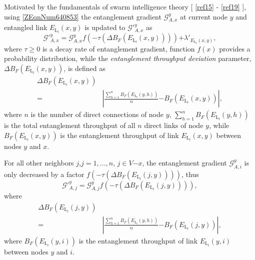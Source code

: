 \documentclass[11pt]{article}%
\newcommand*{\cref}[1]{%
  \begingroup
    \hypersetup{
      linkcolor=linkequation,
      linkbordercolor=linkequation,
    }%
    \ref{#1}%
  \endgroup
}
\begin{document}
 Motivated by the fundamentals of swarm intelligence theory [\cref{ref15}-\cref{ref19}], using \eqref{ZEqnNum640853} the entanglement gradient ${\mathcal{G}}^y_{A,x}$ at current node $y$ and entangled link $E_{{\mathrm{L}}_l}\left(x,y\right)$ is updated to ${\mathcal{G}}'^y_{A,x}$ as
\begin{equation} \label{ZEqnNum489942} 
{\mathcal{G}}'^y_{A,x}\mathrm{=}{\mathcal{G}}^y_{A,x}f\left(\mathrm{-}\tau \left(\mathit{\Delta}B_F\left(E_{{\mathrm{L}}_l}\left(x,y\right)\right)\right)\right)\mathrm{+}{\lambda }'_{E_{{\mathrm{L}}_l}\left(x,y\right)},                                                         
\end{equation} 
where $\tau \mathrm{\ge }\mathrm{0}$ is a decay rate of entanglement gradient, function $f\left(x\right)$ provides a probability distribution, while the \textit{entanglement throughput deviation} parameter, $\mathit{\Delta}B_F\left(E_{{\mathrm{L}}_l}\left(x,y\right)\right)$, is defined as
\begin{equation} \label{4)} 
\begin{split}
\mathit{\Delta}B_F\left(E_{{\mathrm{L}}_l}\left(x,y\right)\right)\\\mathrm{=}&\left|\frac{\sum^n_{h\mathrm{=1}}{B_F\left(E_{{\mathrm{L}}_l}\left(y,h\right)\right)}}{n}\mathrm{-}B_F\left(E_{{\mathrm{L}}_l}\left(x,y\right)\right)\right|,                                                        
\end{split}
\end{equation} 
where $n$ is the number of direct connections of node $y$, $\sum^n_{h\mathrm{=1}}{B_F\left(E_{{\mathrm{L}}_l}\left(y,h\right)\right)}$ is the total entanglement throughput of all $n$ direct links of node $y$, while $B_F\left(E_{{\mathrm{L}}_l}\left(x,y\right)\right)$ is the entanglement throughput of link $E_{{\mathrm{L}}_l}\left(x,y\right)$ between nodes $y$ and $x$. 

 For all other neighbors $j$,$j\mathrm{=1,\dots ,}n$, $j\mathrm{\in }V\mathrm{-}x$, the entanglement gradient ${\mathcal{G}}^y_{A,i}$ is only decreased by a factor $f\left(\mathrm{-}\tau \left(\mathit{\Delta}B_F\left(E_{{\mathrm{L}}_l}\left(j,y\right)\right)\right)\right)$, thus
\begin{equation} \label{ZEqnNum529081} 
{\mathcal{G}}'^y_{A,j}\mathrm{=}{\mathcal{G}}^y_{A,j}f\left(\mathrm{-}\tau \left(\mathit{\Delta}B_F\left(E_{{\mathrm{L}}_l}\left(j,y\right)\right)\right)\right),                                                                     
\end{equation} 
where 
\begin{equation} \label{6)} 
\begin{split}
\mathit{\Delta}B_F\left(E_{{\mathrm{L}}_l}\left(j,y\right)\right)\\\mathrm{=}&\left|\frac{\sum^n_{h\mathrm{=1}}{B_F\left(E_{{\mathrm{L}}_l}\left(y,h\right)\right)}}{n}\mathrm{-}B_F\left(E_{{\mathrm{L}}_l}\left(j,y\right)\right)\right|,                                                     
\end{split}
\end{equation} 
where $B_F\left(E_{{\mathrm{L}}_l}\left(y,i\right)\right)$ is the entanglement throughput of link $E_{{\mathrm{L}}_l}\left(y,i\right)$ between nodes $y$ and $i$. 
\end{document}
